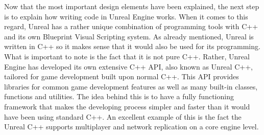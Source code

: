 Now that the most important design elements have been explained, the next step is to explain how writing code in Unreal Engine works. When it comes to this regard, Unreal has a rather unique combination of programming tools with C++ and its own Blueprint Visual Scripting system. As already mentioned, Unreal is written in C++ so it makes sense that it would also be used for its programming. What is important to note is the fact that it is not pure C++. Rather, Unreal Engine has developed its own extensive C++ \acs{API}, also known as Unreal C++, tailored for game development built upon normal C++\cite{bib:UECPlus}. This \acs{API} provides libraries for common game development features as well as many built-in classes, functions and utilities. The idea behind this is to have a fully functioning framework that makes the developing process simpler and faster than it would have been using standard C++. An excellent example of this is the fact the Unreal C++ supports multiplayer and network replication on a core engine level.\\

